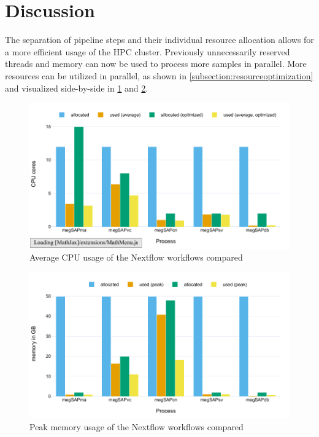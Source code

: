 \section{Discussion}\label{sec:discussion}

The separation of pipeline steps and their individual resource allocation allows for a more efficient usage of the \ac{HPC} cluster. Previously unnecessarily reserved threads and memory can now be used to process more samples in parallel. More resources can be utilized in parallel, as shown in \cref{subsection:resourceoptimization} and visualized side-by-side in \cref{figure:pipeline_benchmark_CPU_compared} and \cref{figure:pipeline_benchmark_memory_compared}.

\begin{figure}[H]
    \centering
	\includegraphics[width=\linewidth,height=\textheight,keepaspectratio]{pipeline_benchmark_CPU_compared}
	\caption{Average CPU usage of the Nextflow workflows compared}
	\label{figure:pipeline_benchmark_CPU_compared}
\end{figure}

\begin{figure}[H]
    \centering
	\includegraphics[width=\linewidth,height=\textheight,keepaspectratio]{pipeline_benchmark_memory_compared}
	\caption{Peak memory usage of the Nextflow workflows compared}
	\label{figure:pipeline_benchmark_memory_compared}
\end{figure}

